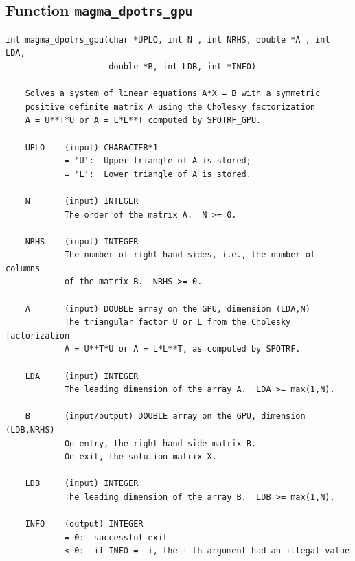 \documentclass[10pt]{book}
\begin{document}
\newpage
\subsection{Function {\tt {\bf magma\_dpotrs\_gpu}}}
\begin{verbatim}
int magma_dpotrs_gpu(char *UPLO, int N , int NRHS, double *A , int LDA,
                     double *B, int LDB, int *INFO)

    Solves a system of linear equations A*X = B with a symmetric
    positive definite matrix A using the Cholesky factorization
    A = U**T*U or A = L*L**T computed by SPOTRF_GPU.

    UPLO    (input) CHARACTER*1
            = 'U':  Upper triangle of A is stored;
            = 'L':  Lower triangle of A is stored.

    N       (input) INTEGER
            The order of the matrix A.  N >= 0.

    NRHS    (input) INTEGER
            The number of right hand sides, i.e., the number of columns
            of the matrix B.  NRHS >= 0.

    A       (input) DOUBLE array on the GPU, dimension (LDA,N)
            The triangular factor U or L from the Cholesky factorization
            A = U**T*U or A = L*L**T, as computed by SPOTRF.

    LDA     (input) INTEGER
            The leading dimension of the array A.  LDA >= max(1,N).

    B       (input/output) DOUBLE array on the GPU, dimension (LDB,NRHS)
            On entry, the right hand side matrix B.
            On exit, the solution matrix X.

    LDB     (input) INTEGER
            The leading dimension of the array B.  LDB >= max(1,N).

    INFO    (output) INTEGER
            = 0:  successful exit
            < 0:  if INFO = -i, the i-th argument had an illegal value
\end{verbatim}


\newpage
\end{document}
